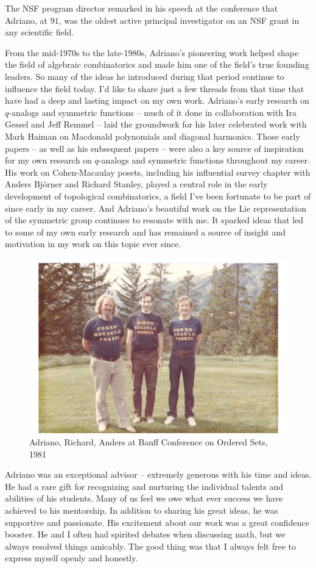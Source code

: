 \documentclass{notices}
\begin{document}
The NSF program director remarked in his speech at the conference that Adriano, at $91$, was the oldest active principal investigator on an NSF grant in any scientific field. 

From the mid-1970s to the late-1980s, Adriano's pioneering work helped shape the field of algebraic combinatorics and made him  one of the field's true founding leaders. So many of the ideas he introduced during that  period continue to influence the field today. I'd like to share just a few threads from that time that have had a deep and lasting impact on my own work.
 Adriano's early research on 
$q$-analogs and symmetric functions -- much of it done in collaboration with Ira Gessel and Jeff Remmel -- laid the groundwork for his later celebrated work with Mark Haiman on Macdonald polynomials and diagonal harmonics. Those early papers -- as well as his subsequent papers --  were also a key source of inspiration for my own research on $q$-analogs and symmetric functions throughout my career. His work on Cohen-Macaulay posets, including his influential survey chapter  with Anders Bj\"orner and Richard Stanley, played a central role in the early development of topological combinatorics,  a field I've been fortunate to be part of since  early in my career. And Adriano's beautiful work on the Lie representation of the symmetric group continues to resonate with me. It sparked ideas that led to some of my own early research and has remained a source of insight and motivation in my work on this topic ever since.

\begin{figure}
    \centering
    \includegraphics[width=\linewidth]{Michelle_Wachs/cmposets.pdf} 
  {\footnotesize Adriano, Richard, Anders at Banff Conference on Ordered Sets, 1981}
\end{figure}
Adriano was an exceptional advisor -- extremely generous with his time and ideas. He had a rare gift for recognizing and nurturing the individual talents and abilities of his students.   Many of us feel we owe what ever success we have achieved to his mentorship.  In addition to sharing his great ideas, he was supportive and passionate.  His excitement about our work was a great confidence booster.  He and I often had spirited debates when discussing math,  but we always resolved things amicably.   The good thing was that I always felt free to express myself openly and honestly. 
\end{document}
